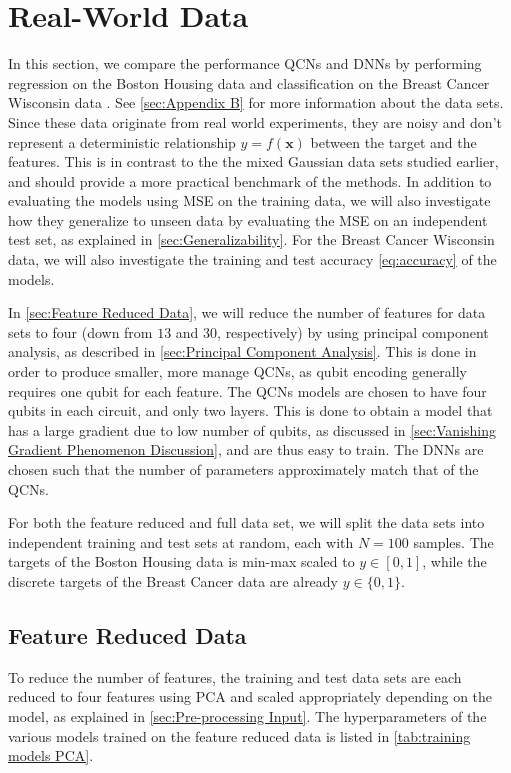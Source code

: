 \section{Real-World Data}\label{sec:Real Data}
In this section, we compare the performance QCNs and DNNs by performing regression on the Boston Housing data \cite{boston} and classification on the Breast Cancer Wisconsin data \cite{cancer}. See \autoref{sec:Appendix B} for more information about the data sets. Since these data originate from real world experiments, they are noisy and don't represent a deterministic relationship $y = f(\boldsymbol{x})$ between the target and the features. This is in contrast to the the mixed Gaussian data sets studied earlier, and should provide a more practical benchmark of the methods. In addition to evaluating the models using MSE on the training data, we will also investigate how they generalize to unseen data by evaluating the MSE on an independent test set, as explained in \autoref{sec:Generalizability}. For the Breast Cancer Wisconsin data, we will also investigate the training and test accuracy \autoref{eq:accuracy} of the models.

In \autoref{sec:Feature Reduced Data}, we will reduce the number of features for data sets to four (down from $13$ and $30$, respectively) by using principal component analysis, as described in \autoref{sec:Principal Component Analysis}. This is done in order to produce smaller, more manage QCNs, as qubit encoding generally requires one qubit for each feature. The QCNs models are chosen to have four qubits in each circuit, and only two layers. This is done to obtain a model that has a large gradient due to low number of qubits, as discussed in \autoref{sec:Vanishing Gradient Phenomenon Discussion}, and are thus easy to train. The DNNs are chosen such that the number of parameters approximately match that of the QCNs. 

For both the feature reduced and full data set, we will split the data sets into independent training and test sets at random, each with $N=100$ samples. The targets of the Boston Housing data is min-max scaled to $y \in [0,1]$, while the discrete targets of the Breast Cancer data are already $y \in \{0,1\}$.

\subsection{Feature Reduced Data}\label{sec:Feature Reduced Data}
To reduce the number of features, the training and test data sets are each reduced to four features using PCA and scaled appropriately depending on the model, as explained in \autoref{sec:Pre-processing Input}. The hyperparameters of the various models trained on the feature reduced data is listed in \autoref{tab:training models PCA}.

